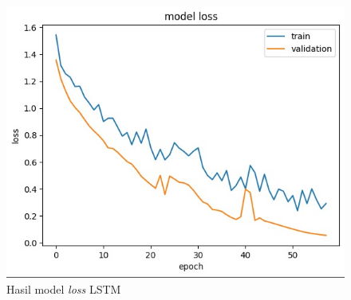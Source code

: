 \begin{figure} [H] \centering
  \includegraphics[scale=0.5]{gambar/akurasi loss.jpg}
  \caption{Hasil model \emph{loss} LSTM}
  \label{fig:Pengujian Performa model loss lstm}
\end{figure}

